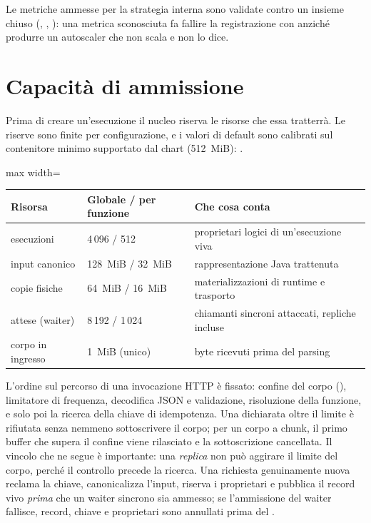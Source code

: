 Le metriche ammesse per la strategia interna sono validate contro un insieme
chiuso (, , ): una metrica
sconosciuta fa fallire la registrazione con  anzich\'e produrre un
autoscaler che non scala e non lo dice.

\section{Capacit\`a di ammissione}
\label{sec:06-capacita}

Prima di creare un'esecuzione il nucleo riserva le risorse che essa
tratterr\`a. Le riserve sono finite per configurazione, e i valori di default
sono calibrati sul contenitore minimo supportato dal chart (512~MiB):
.

\begin{center}
\small
\begin{adjustbox}{max width=\textwidth}
\begin{tabular}{@{}lll@{}}
\toprule
\textbf{Risorsa} & \textbf{Globale / per funzione} & \textbf{Che cosa conta} \\
\midrule
esecuzioni & 4\,096 / 512 & proprietari logici di un'esecuzione viva \\
input canonico & 128~MiB / 32~MiB & rappresentazione Java trattenuta \\
copie fisiche & 64~MiB / 16~MiB & materializzazioni di runtime e trasporto \\
attese (waiter) & 8\,192 / 1\,024 & chiamanti sincroni attaccati, repliche incluse \\
corpo in ingresso & 1~MiB (unico) & byte ricevuti prima del parsing \\
\bottomrule
\end{tabular}
\end{adjustbox}
\end{center}

L'ordine sul percorso di una invocazione HTTP \`e fissato: confine del corpo
(), limitatore di frequenza, decodifica JSON e validazione, risoluzione
della funzione, e solo poi la ricerca della chiave di idempotenza. Una 
dichiarata oltre il limite \`e rifiutata senza nemmeno sottoscrivere il corpo; per
un corpo a chunk, il primo buffer che supera il confine viene rilasciato e la
sottoscrizione cancellata. Il vincolo che ne segue \`e importante: una
\emph{replica} non pu\`o aggirare il limite del corpo, perch\'e il controllo
precede la ricerca. Una richiesta genuinamente nuova reclama la chiave,
canonicalizza l'input, riserva i proprietari e pubblica il record vivo \emph{prima}
che un waiter sincrono sia ammesso; se l'ammissione del waiter fallisce,
record, chiave e proprietari sono annullati prima del .

